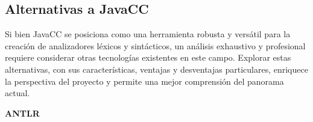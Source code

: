







\subsection{Alternativas a JavaCC}


\noindent Si bien JavaCC se posiciona como una herramienta robusta y versátil para la creación de analizadores léxicos y sintácticos, un análisis exhaustivo y profesional requiere considerar otras tecnologías existentes en este campo. Explorar estas alternativas, con sus características, ventajas y desventajas particulares, enriquece la perspectiva del proyecto y permite una mejor comprensión del panorama actual.

\phantom{text}

\noindent \textbf{ANTLR}

